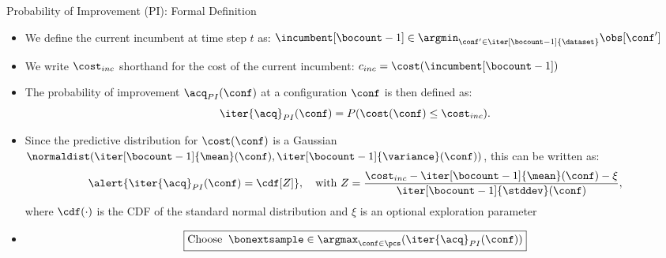 \begin{frame}[c]{Probability of Improvement (PI): Formal Definition}
\begin{itemize}
    \item We define the \alert{current incumbent at time step $t$} as: 
    $\incumbent[\bocount-1]\in\argmin_{\conf'\in\iter[\bocount-1]{\dataset}}\obs[\conf']$
    \item We write \alert{$\cost_{inc}$} shorthand for the \alert{cost of the current incumbent}: 
    $c_{inc} = \cost(\incumbent[\bocount-1])$
\smallskip
        \item The \alert{probability of improvement $\acq_{PI}(\conf)$} at a configuration $\conf$ is then defined as: 
        \alert{\[\iter{\acq}_{PI}(\conf) = P(\cost(\conf) \leq \cost_{inc}).\]}
    \vspace*{-0.5cm}
    \pause
    \item Since the predictive distribution for $\cost(\conf)$ is a Gaussian $\normaldist(\iter[\bocount-1]{\mean}(\conf), \iter[\bocount-1]{\variance}(\conf))$, this can be written as:
    \[
        \alert{\iter{\acq}_{PI}(\conf) = \cdf[Z]}, \quad \text{with } Z = \dfrac{\cost_{inc} - \iter[\bocount-1]{\mean}(\conf) - \xi}{\iter[\bocount-1]{\stddev}(\conf)}, 
    \]
    \newline
    where $\cdf(\cdot)$ is the CDF of the standard normal distribution and $\xi$ is an optional exploration parameter
    \pause
    \item[] \[\boxed{\text{Choose}\;\;\bonextsample \in \argmax_{\conf\in\pcs}(\iter{\acq}_{PI}(\conf))}\]
\end{itemize}
\end{frame}
